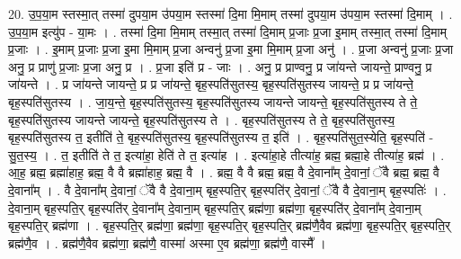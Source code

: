 \documentclass[17pt]{extarticle}
\begin{document}
20. उ॒प॒या॒म स्तस्मा॒त् तस्मा॑ दुपया॒म उ॑पया॒म स्तस्मा॑ दि॒मा मि॒माम् तस्मा॑ दुपया॒म उ॑पया॒म स्तस्मा॑ दि॒माम् । . उ॒प॒या॒म इत्यु॑प - या॒मः । . तस्मा॑ दि॒मा मि॒माम् तस्मा॒त् तस्मा॑ दि॒माम् प्र॒जाः प्र॒जा इ॒माम् तस्मा॒त् तस्मा॑ दि॒माम् प्र॒जाः । . इ॒माम् प्र॒जाः प्र॒जा इ॒मा मि॒माम् प्र॒जा अन्वनु॑ प्र॒जा इ॒मा मि॒माम् प्र॒जा अनु॑ । . प्र॒जा अन्वनु॑ प्र॒जाः प्र॒जा अनु॒ प्र प्राणु॑ प्र॒जाः प्र॒जा अनु॒ प्र । . प्र॒जा इति॑ प्र - जाः । . अनु॒ प्र प्राण्वनु॒ प्र जा॑यन्ते जायन्ते॒ प्राण्वनु॒ प्र जा॑यन्ते । . प्र जा॑यन्ते जायन्ते॒ प्र प्र जा॑यन्ते॒ बृह॒स्पति॑सुतस्य॒ बृह॒स्पति॑सुतस्य जायन्ते॒ प्र प्र जा॑यन्ते॒ बृह॒स्पति॑सुतस्य । . जा॒य॒न्ते॒ बृह॒स्पति॑सुतस्य॒ बृह॒स्पति॑सुतस्य जायन्ते जायन्ते॒ बृह॒स्पति॑सुतस्य ते ते॒ बृह॒स्पति॑सुतस्य जायन्ते जायन्ते॒ बृह॒स्पति॑सुतस्य ते । . बृह॒स्पति॑सुतस्य ते ते॒ बृह॒स्पति॑सुतस्य॒ बृह॒स्पति॑सुतस्य त॒ इतीति॑ ते॒ बृह॒स्पति॑सुतस्य॒ बृह॒स्पति॑सुतस्य त॒ इति॑ । . बृह॒स्पति॑सुत॒स्येति॒ बृह॒स्पति॑ - सु॒त॒स्य॒ । . त॒ इतीति॑ ते त॒ इत्या॑हा॒ हेति॑ ते त॒ इत्या॑ह । . इत्या॑हा॒हे तीत्या॑ह॒ ब्रह्म॒ ब्रह्मा॒हे तीत्या॑ह॒ ब्रह्म॑ । . आ॒ह॒ ब्रह्म॒ ब्रह्मा॑हाह॒ ब्रह्म॒ वै वै ब्रह्मा॑हाह॒ ब्रह्म॒ वै । . ब्रह्म॒ वै वै ब्रह्म॒ ब्रह्म॒ वै दे॒वाना᳚म् दे॒वानां॒ ॅवै ब्रह्म॒ ब्रह्म॒ वै दे॒वाना᳚म् । . वै दे॒वाना᳚म् दे॒वानां॒ ॅवै वै दे॒वाना॒म् बृह॒स्पति॒र् बृह॒स्पति॑र् दे॒वानां॒ ॅवै वै दे॒वाना॒म् बृह॒स्पतिः॑ । . दे॒वाना॒म् बृह॒स्पति॒र् बृह॒स्पति॑र् दे॒वाना᳚म् दे॒वाना॒म् बृह॒स्पति॒र् ब्रह्म॑णा॒ ब्रह्म॑णा॒ बृह॒स्पति॑र् दे॒वाना᳚म् दे॒वाना॒म् बृह॒स्पति॒र् ब्रह्म॑णा । . बृह॒स्पति॒र् ब्रह्म॑णा॒ ब्रह्म॑णा॒ बृह॒स्पति॒र् बृह॒स्पति॒र् ब्रह्म॑णै॒वैव ब्रह्म॑णा॒ बृह॒स्पति॒र् बृह॒स्पति॒र् ब्रह्म॑णै॒व । . ब्रह्म॑णै॒वैव ब्रह्म॑णा॒ ब्रह्म॑णै॒ वास्मा॑ अस्मा ए॒व ब्रह्म॑णा॒ ब्रह्म॑णै॒ वास्मै᳚ । \newline
\end{document}
